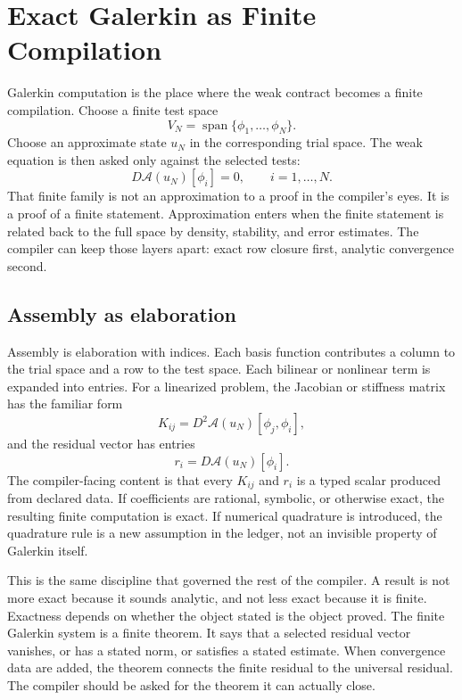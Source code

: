 \chapter{Exact Galerkin as Finite Compilation}
\label{chap:exact-galerkin-finite-compilation}

Galerkin computation is the place where the weak contract becomes a finite compilation. Choose a finite
test space
\[
  V_N = \operatorname{span}\{\phi_1,\ldots,\phi_N\}.
\]
Choose an approximate state \(u_N\) in the corresponding trial space. The weak equation is then asked only
against the selected tests:
\[
  D\mathcal A(u_N)[\phi_i] = 0,
  \qquad i=1,\ldots,N .
\]
That finite family is not an approximation to a proof in the compiler's eyes. It is a proof of a finite
statement. Approximation enters when the finite statement is related back to the full space by density,
stability, and error estimates. The compiler can keep those layers apart: exact row closure first,
analytic convergence second.

\section{Assembly as elaboration}
\label{se:assembly-as-elaboration}

Assembly is elaboration with indices. Each basis function contributes a column to the trial space and a row
to the test space. Each bilinear or nonlinear term is expanded into entries. For a linearized problem, the
Jacobian or stiffness matrix has the familiar form
\[
  K_{ij} = D^2\mathcal A(u_N)[\phi_j,\phi_i],
\]
and the residual vector has entries
\[
  r_i = D\mathcal A(u_N)[\phi_i].
\]
The compiler-facing content is that every \(K_{ij}\) and \(r_i\) is a typed scalar produced from declared
data. If coefficients are rational, symbolic, or otherwise exact, the resulting finite computation is
exact. If numerical quadrature is introduced, the quadrature rule is a new assumption in the ledger, not an
invisible property of Galerkin itself.

This is the same discipline that governed the rest of the compiler. A result is not more exact because it
sounds analytic, and not less exact because it is finite. Exactness depends on whether the object stated is
the object proved. The finite Galerkin system is a finite theorem. It says that a selected residual vector
vanishes, or has a stated norm, or satisfies a stated estimate. When convergence data are added, the theorem
connects the finite residual to the universal residual. The compiler should be asked for the theorem it can
actually close.

